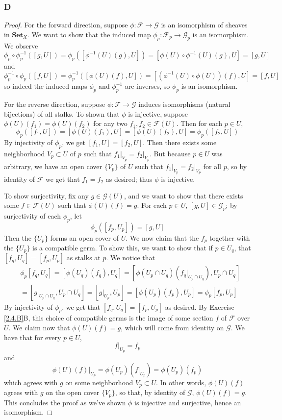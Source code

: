 \documentclass{article}
\newcommand{\fF}{\mathscr{F}}
\newcommand{\fG}{\mathscr{G}}
\newcommand{\Set}{\mathbf{Set}} %
\begin{document}
\subsubsection{D}\label{2.4.D}
\begin{proof}
    For the forward direction, suppose $\phi:\fF \to \fG$ is an isomorphism of sheaves in $\Set_X$. We want to show that the induced map $\phi_p:\fF_p\to \fG_p$ is an isomorphism. We observe
    \[
    \phi_p\circ \phi_p^{-1}([g,U])=\phi_p([\phi^{-1}(U)(g),U])=[\phi(U)\circ \phi^{-1}(U)(g),U]=[g,U]
    \]
    and
    \[
    \phi_p^{-1}\circ \phi_p([f,U])=\phi_p^{-1}([\phi(U)(f),U])=[(\phi^{-1}(U)\circ \phi(U))(f),U]=[f,U]
    \]
    so indeed the induced maps $\phi_p$ and $\phi_p^{-1}$ are inverses, so $\phi_p$ is an isomorphism.

    For the reverse direction, suppose $\phi:\fF\to \fG$ induces isomorphisms (natural bijections) of all stalks. To shown that $\phi$ is injective, suppose $\phi(U)(f_1)=\phi(U)(f_2)$ for any two $f_1,f_2\in \fF(U)$. Then for each $p\in U$,
    \[
    \phi_p([f_1,U])=[\phi(U)(f_1),U]=[\phi(U)(f_2),U]=\phi_p([f_2,U])
    \]
    By injectivity of $\phi_p$, we get $[f_1,U]=[f_2,U]$. Then there exists some neighborhood $V_p\subset U$ of $p$ such that $f_1\vert_{V_p}=f_2\vert_{V_p}$. But because $p\in U$ was arbitrary, we have an open cover $\{V_p\}$ of $U$ such that $f_1\vert_{V_p}=f_2\vert_{V_p}$ for all $p$, so by identity of $\fF$ we get that $f_1=f_2$ as desired; thus $\phi$ is injective.

    To show surjectivity, fix any $g\in \fG(U)$, and we want to show that there exists some $f\in \fF(U)$ such that $\phi(U)(f)=g$. For each $p\in U$, $[g,U]\in \fG_p$; by surjectivity of each $\phi_p$, let
    \[
    \phi_p([f_p,U_p])=[g,U]
    \]
    Then the $\{U_p\}$ forms an open cover of $U$. We now claim that the $f_p$ together with the $\{U_p\}$ is a compatible germ. To show this, we want to show that if $p\in U_q$, that $[f_q,U_q]=[f_p,U_p]$ as stalks at $p$. We notice that
    \begin{align*}
        &\phi_p[f_q,U_q]=[\phi(U_q)(f_q),U_q]=[\phi(U_p\cap U_q)(f_q\vert_{U_p\cap U_q}),U_p\cap U_q]\\
        &=[g\vert_{U_p\cap U_q},U_p\cap U_q]=[g\vert_{U_p},U_p]=[\phi(U_p)(f_p),U_p]=\phi_p[f_p,U_p]
    \end{align*}
    By injectivity of $\phi_p$, we get that $[f_q,U_q]=[f_p,U_p]$ as desired. By Exercise \ref{2.4.B}B, this choice of compatible germs is the image of some section $f$ of $\fF$ over $U$. We claim now that $\phi(U)(f)=g$, which will come from identity on $\fG$. We have that for every $p\in U$,
    \[
    f\vert_{U_p}=f_p
    \]
    and
    \[
    \phi(U)(f)\vert_{U_p}=\phi(U_p)(f\vert_{U_p})=\phi(U_p)(f_p)
    \]
    which agrees with $g$ on some neighborhood $V_p\subset U$. In other words, $\phi(U)(f)$ agrees with $g$ on the open cover $\{V_p\}$, so that, by identity of $\fG$, $\phi(U)(f)=g$. This concludes the proof as we've shown $\phi$ is injective and surjective, hence an isomorphism.
\end{proof}
\end{document}
